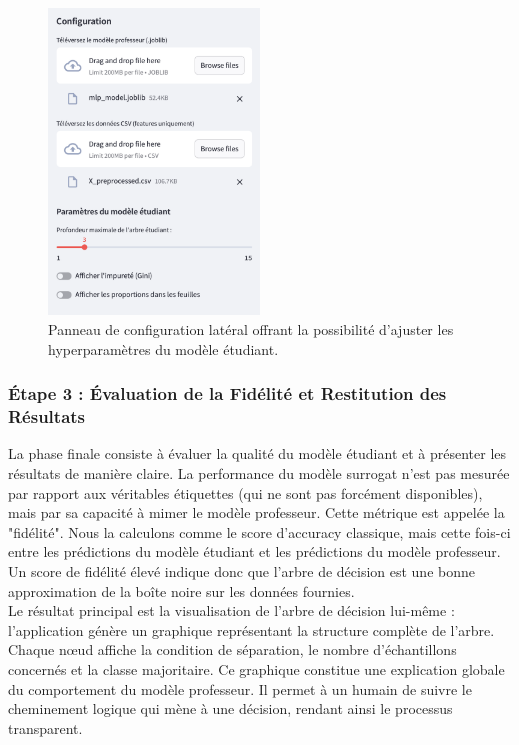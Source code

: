 \documentclass{article}
\begin{document}
    \begin{figure}[h!]
        \centering
        \includegraphics[width=0.5\textwidth]{app_lateral.png}
        \caption{Panneau de configuration latéral offrant la possibilité d'ajuster les hyperparamètres du modèle étudiant.}
        \label{fig:config_panel}
    \end{figure}

\clearpage

    \subsubsection{Étape 3 : Évaluation de la Fidélité et Restitution des Résultats}
    
    \quad La phase finale consiste à évaluer la qualité du modèle étudiant et à présenter les résultats de manière claire. La performance du modèle surrogat n'est pas mesurée par rapport aux véritables étiquettes (qui ne sont pas forcément disponibles), mais par sa capacité à mimer le modèle professeur. Cette métrique est appelée la "fidélité". Nous la calculons comme le score d'accuracy classique, mais cette fois-ci entre les prédictions du modèle étudiant et les prédictions du modèle professeur. Un score de fidélité élevé indique donc que l'arbre de décision est une bonne approximation de la boîte noire sur les données fournies.\\
    
    Le résultat principal est la visualisation de l'arbre de décision lui-même : l'application génère un graphique représentant la structure complète de l'arbre. Chaque nœud affiche la condition de séparation, le nombre d'échantillons concernés et la classe majoritaire. Ce graphique constitue une explication globale du comportement du modèle professeur. Il permet à un humain de suivre le cheminement logique qui mène à une décision, rendant ainsi le processus transparent.
    
\end{document}

